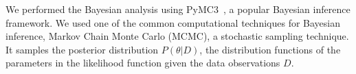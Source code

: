We performed the Bayesian analysis using PyMC3~\cite{salvatier2016probabilistic}, 
a popular Bayesian inference framework. We used one of the common computational techniques for Bayesian inference, Markov Chain Monte Carlo (MCMC), a stochastic sampling technique. It samples the posterior distribution $P(\theta | D)$, the distribution functions of the parameters in the likelihood function given the data observations $D$. 
